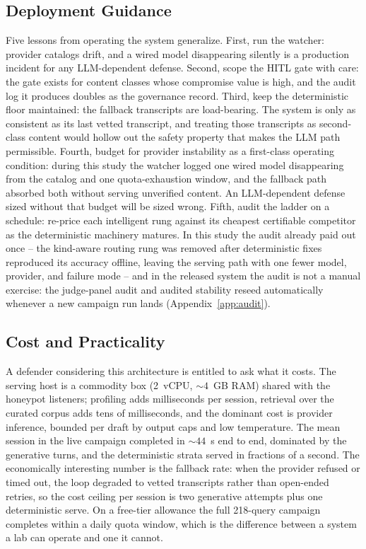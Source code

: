 \subsection{Deployment Guidance}
Five lessons from operating the system generalize. First, run the
watcher: provider catalogs drift, and a wired model disappearing silently
is a production incident for any LLM-dependent defense. Second, scope the
HITL gate with care: the gate exists for content classes whose
compromise value is high, and the audit log it produces doubles as the
governance record. Third, keep the deterministic floor maintained: the
fallback transcripts are load-bearing. The system is only as consistent
as its last vetted transcript, and treating those transcripts as second-class
content would hollow out the safety property that makes the LLM path
permissible. Fourth, budget for provider instability as a first-class
operating condition: during this study the watcher logged one wired model
disappearing from the catalog and one quota-exhaustion window, and the
fallback path absorbed both without serving unverified content. An
LLM-dependent defense sized without that budget will be sized wrong.
Fifth, audit the ladder on a schedule: re-price each intelligent rung
against its cheapest certifiable competitor as the deterministic
machinery matures. In this study the audit already paid out once -- the
kind-aware routing rung was removed after deterministic fixes reproduced
its accuracy offline, leaving the serving path with one fewer model,
provider, and failure mode -- and in the released system the audit is
not a manual exercise: the judge-panel audit and audited stability
reseed automatically whenever a new campaign run lands (Appendix~\ref{app:audit}).

\subsection{Cost and Practicality}
A defender considering this architecture is entitled to ask what it costs.
The serving host is a commodity box (2~vCPU, ${\sim}4$~GB RAM) shared with
the honeypot listeners; profiling adds milliseconds per session, retrieval
over the curated corpus adds tens of milliseconds, and the dominant cost
is provider inference, bounded per draft by output caps and low
temperature. The mean session in the live campaign completed in
${\sim}44$~s end to end, dominated by the generative turns, and the
deterministic strata served in fractions of a second. The economically
interesting number is the fallback rate: when the provider refused or
timed out, the loop degraded to vetted transcripts rather than
open-ended retries, so the cost ceiling per session is two generative
attempts plus one deterministic serve. On a free-tier allowance the full
218-query campaign completes within a daily quota window, which is the
difference between a system a lab can operate and one it cannot.

